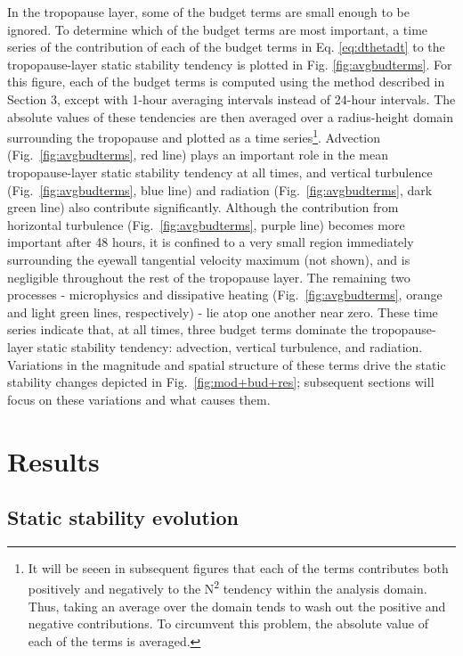 \documentclass{ametsoc}
\begin{document}
In the tropopause layer, some of the budget terms are small enough to be ignored.
To determine which of the budget terms are most important, a time series of the contribution of each of the budget terms in Eq. \ref{eq:dthetadt} to the tropopause-layer static stability tendency is plotted in Fig. \ref{fig:avgbudterms}.
For this figure, each of the budget terms is computed using the method described in Section 3, except with 1-hour averaging intervals instead of 24-hour intervals.
The absolute values of these tendencies are then averaged over a radius-height domain surrounding the tropopause and plotted as a time series\footnote{It will be seeen in subsequent figures that each of the terms contributes both positively and negatively to the N\textsuperscript{2} tendency within the analysis domain. 
Thus, taking an average over the domain tends to wash out the positive and negative contributions.
To circumvent this problem, the absolute value of each of the terms is averaged.}. 
Advection (Fig.~\ref{fig:avgbudterms}, red line) plays an important role in the mean tropopause-layer static stability tendency at all times, and vertical turbulence (Fig.~\ref{fig:avgbudterms}, blue line) and radiation (Fig.~\ref{fig:avgbudterms}, dark green line) also contribute significantly. %
Although the contribution from horizontal turbulence (Fig.~\ref{fig:avgbudterms}, purple line) becomes more important after 48 hours, it is confined to a very small region immediately surrounding the eyewall tangential velocity maximum (not shown), and is negligible throughout the rest of the tropopause layer.
The remaining two processes - microphysics and dissipative heating (Fig.~\ref{fig:avgbudterms}, orange and light green lines, respectively) - lie atop one another near zero.
These time series indicate that, at all times, three budget terms dominate the tropopause-layer static stability tendency: advection, vertical turbulence, and radiation.
Variations in the magnitude and spatial structure of these terms drive the static stability changes depicted in Fig.~\ref{fig:mod+bud+res}; subsequent sections will focus on these variations and what causes them.

 \section{Results}

 \subsection{Static stability evolution}
\end{document}
